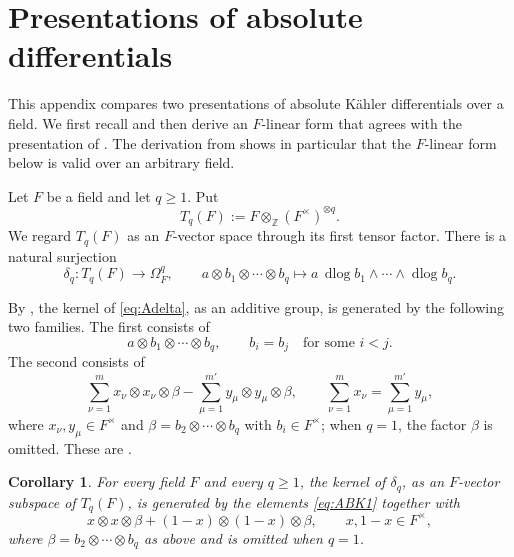 \documentclass[a4paper,12pt,reqno]{amsart}
\numberwithin{equation}{section}
\newtheorem{cor}[cor]{Corollary}
\theoremstyle{definition}
\newcommand{\Z}{\mathbb{Z}}
\DeclareMathOperator{\dlog}{dlog}
\begin{document}
\appendix
\section{Presentations of absolute differentials}\label{app:diff}

This appendix compares two presentations of absolute K\"ahler differentials
over a field.  We first recall \cite[Lemma~4.2]{BK86} and then derive an
$F$-linear form that agrees with the presentation of
\cite[Lemma~4.1]{BE03}.  The derivation from \cite{BK86} shows in particular
that the $F$-linear form below is valid over an arbitrary field.

Let $F$ be a field and let $q\geq1$.  Put
\begin{equation}\label{eq:ATq}
 T_q(F):=F\otimes_{\Z}(F^\times)^{\otimes q}.
\end{equation}
We regard $T_q(F)$ as an $F$-vector space through its first tensor factor.
There is a natural surjection
\begin{equation}\label{eq:Adelta}
 \delta_q:T_q(F)\to\Omega_F^q,
 \qquad
 a\otimes b_1\otimes\cdots\otimes b_q
 \mapsto a\,\dlog b_1\wedge\cdots\wedge \dlog b_q.
\end{equation}


By  
\cite[Lemma~4.2]{BK86}, 
the kernel of \eqref{eq:Adelta}, as an additive group, is generated by the following two
families.  The first consists of
\begin{equation}\label{eq:ABK1}
 a\otimes b_1\otimes\cdots\otimes b_q,
 \qquad b_i=b_j\quad\text{for some }i<j.
\end{equation}
The second consists of
\begin{equation}\label{eq:ABK2}
 \sum_{\nu=1}^{m}x_\nu\otimes x_\nu\otimes\beta
 -\sum_{\mu=1}^{m'}y_\mu\otimes y_\mu\otimes\beta,
 \qquad
 \sum_{\nu=1}^{m}x_\nu=\sum_{\mu=1}^{m'}y_\mu,
\end{equation}
where $x_\nu,y_\mu\in F^\times$ and
$\beta=b_2\otimes\cdots\otimes b_q$ with $b_i\in F^\times$; when
$q=1$, the factor $\beta$ is omitted.  These are
\cite[Equations~(4.2.1) and~(4.2.2)]{BK86}.


\begin{cor}\label{cor:Aflin}
For every field $F$ and every $q\geq1$, the kernel of $\delta_q$, 
as an $F$-vector subspace of $T_q(F)$, is generated by the elements
\eqref{eq:ABK1} together with
\begin{equation}\label{eq:ACat}
 x\otimes x\otimes\beta
 +(1-x)\otimes(1-x)\otimes\beta,
 \qquad x,1-x\in F^\times,
\end{equation}
where $\beta=b_2\otimes\cdots\otimes b_q$ as above and is omitted when
$q=1$.
\end{cor}
\end{document}
